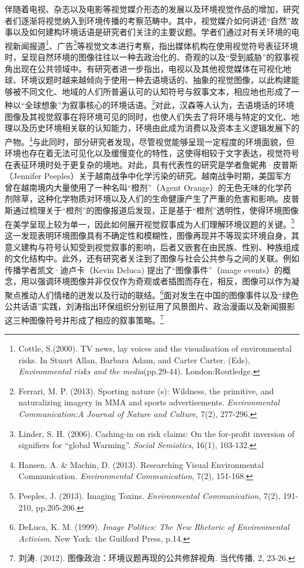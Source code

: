 伴随着电视、杂志以及电影等视觉媒介形态的发展以及环境视觉作品的增加，研究者们逐渐将视觉纳入到环境传播的考察范畴中。其中，视觉媒介如何讲述``自然''故事以及如何建构环境话语是研究者们关注的主要议题。学者们通过对有关环境的电视新闻报道\footnote{Cottle,
  S.(2000). TV news, lay voices and the visualisation of environmental
  risks. In Stuart Allan, Barbara Adam, and Carter Carter. (Eds),
  \emph{Environmental risks and the media}(pp.29-44). London:Routledge.}、广告\footnote{Ferrari,
  M. P. (2013). Sporting nature (s): Wildness, the primitive, and
  naturalizing imagery in MMA and sports advertisements.
  \emph{Environmental Communication:A Journal of Nature and Culture,}
  7(2), 277-296.}等视觉文本进行考察，指出媒体机构在使用视觉符号表征环境时，呈现自然环境的图像往往以一种去政治化的、奇观的以及``受到威胁''的叙事视角出现在公共领域中。有研究者进一步指出，电视以及其他视觉媒体在可视化地球、环境议题时越来越倾向于使用一种去语境话的、抽象的视觉图像，以此构建能够被不同文化、地域的人们所普遍认可的认知符号与叙事文本，相应地也形成了一种以``全球想象''为叙事核心的环境话语。\footnote{Linder,
  S. H. (2006). Cashing-in on risk claims: On the for-profit inversion
  of signifiers for ``global Warming''. \emph{Social Semiotics}, 16(1),
  103-132.}对此，汉森等人认为，去语境话的环境图像及其视觉叙事在将环境可见的同时，也使人们失去了将环境与特定的文化、地理以及历史环境相关联的认知能力，环境由此成为消费以及资本主义逻辑发展下的产物。\footnote{Hansen,
  A. \& Machin, D. (2013). Researching Visual Environmental
  Communication. \emph{Environmental Communication}, 7(2), 151-168.}与此同时，部分研究者发现，尽管视觉能够呈现一定程度的环境面貌，但环境也存在着无法可见化以及缓慢变化的特性，这使得相较于文字表达，视觉符号在表征环境时处于更复杂的境地。对此，具有代表性的研究是学者詹妮弗·皮普斯（Jennifer
Peeples）关于越南战争中化学污染的研究。越南战争时期，美国军方曾在越南境内大量使用了一种名叫``橙剂''（Agent
Orange）的无色无味的化学药剂除草，这种化学物质对环境以及人们的生命健康产生了严重的危害和影响。皮普斯通过梳理关于``橙剂''的图像报道后发现，正是基于``橙剂''透明性，使得环境图像在美学呈现上较为单一，因此如何展开视觉叙事成为人们理解环境议题的关键。\footnote{Peeples,
  J. (2013). Imaging Toxins. \emph{Environmental Communication}, 7(2),
  191-210, pp.205-206.}这一发现表明环境图像具有不确定性和模糊性，图像再现并不等现实环境自身，其意义建构与符号认知受到视觉叙事的影响，后者又嵌套在由民族、性别、种族组成的文化结构中。此外，还有研究者关注到了图像与社会公共参与之间的关联。例如传播学者凯文·迪卢卡（Kevin
Deluca) 提出了``图像事件''（image
events）的概念，用以强调环境图像并非仅仅作为奇观或者插图而存在，相反，图像可以作为凝聚点推动人们情绪的迸发以及行动的联结。\footnote{DeLuca,
  K. M. (1999). \emph{Image Politics: The New Rhetoric of Environmental
  Activism}. New York: the Guilford Press, p.14.}面对发生在中国的图像事件以及``绿色公共话语''实践，刘涛指出环保组织分别征用了风景图片、政治漫画以及新闻摄影这三种图像符号并形成了相应的叙事策略。\footnote{刘涛.
  (2012). 图像政治：环境议题再现的公共修辞视角. 当代传播, 2, 23-26.}

